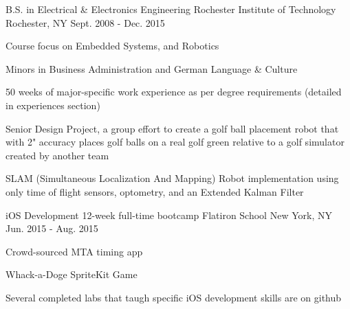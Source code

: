 
 \begin{cventries}
     \cventry
     {B.S. in Electrical \& Electronics Engineering} %
     {Rochester Institute of Technology} %
     {Rochester, NY} %
     {Sept. 2008 - Dec. 2015} %
     {
        \begin{cvitems} %
        \item {Course focus on Embedded Systems, and Robotics}
        \item {Minors in Business Administration and German Language \& Culture}
        \item {50 weeks of major-specific work experience as per degree          requirements (detailed in experiences section)}
        \item {Senior Design Project, a group effort to create a golf ball       placement robot that with 2" accuracy places golf balls on a real golf green relative to a golf simulator created by another team}
        \item {SLAM (Simultaneous Localization And Mapping) Robot                implementation using only time of flight sensors, optometry, and an Extended Kalman Filter}
        \end{cvitems}
     }
     \cventry
     {iOS Development 12-week full-time bootcamp}
     {Flatiron School}
     {New York, NY}
     {Jun. 2015 - Aug. 2015}
     {
        \begin{cvitems}
        \item{Crowd-sourced MTA timing app}
        \item{Whack-a-Doge SpriteKit Game}
        \item{Several completed labs that taugh specific iOS development skills are on github}
        \end{cvitems}
     }
\end{cventries}
